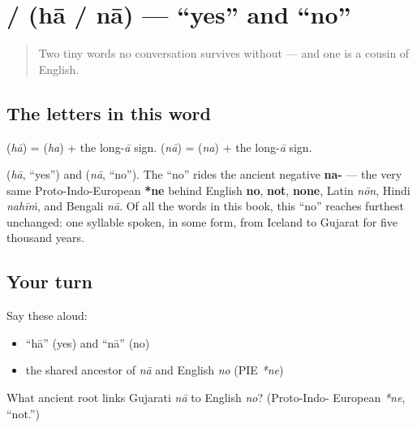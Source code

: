 \section[\gu{હા} / \gu{ના}]{ /  (hā / nā) — \textquotedblleft{}yes\textquotedblright{} and \textquotedblleft{}no\textquotedblright{}}

\label{lesson:GU-C01-haa-naa}



\begin{quote}
Two tiny words no conversation survives without — and one is a cousin of English.
\end{quote}

\subsection*{The letters in this word}
\textbf{} (\emph{hā}) = \textbf{} (\emph{ha}) + the long-\emph{ā} sign. \textbf{} (\emph{nā}) = \textbf{} (\emph{na}) + the long-\emph{ā} sign.

\begin{cousinweb}
\textbf{} (\emph{hā}, \textquotedblleft{}yes\textquotedblright{}) and \textbf{} (\emph{nā}, \textquotedblleft{}no\textquotedblright{}). The \textquotedblleft{}no\textquotedblright{} rides the ancient negative \textbf{na-} — the very same Proto-Indo-European \textbf{*ne} behind English \textbf{no}, \textbf{not}, \textbf{none}, Latin \emph{nōn}, Hindi \emph{nahīṁ}, and Bengali \emph{nā}. Of all the words in this book, this \textquotedblleft{}no\textquotedblright{} reaches furthest unchanged: one syllable spoken, in some form, from Iceland to Gujarat for five thousand years.
\end{cousinweb}

\subsection*{Your turn}
Say these aloud:

\begin{itemize}
\raggedright
  \item \textquotedblleft{}hā\textquotedblright{} (yes) and \textquotedblleft{}nā\textquotedblright{} (no)
  \item the shared ancestor of \emph{nā} and English \emph{no} (PIE \emph{*ne})
\end{itemize}

\begin{tcolorbox}[breakable,colback=teal!4,colframe=teal!35!black,title={Before you move on}]
What ancient root links Gujarati \emph{nā} to English \emph{no}? (Proto-Indo- European \emph{*ne}, \textquotedblleft{}not.\textquotedblright{})
\end{tcolorbox}
